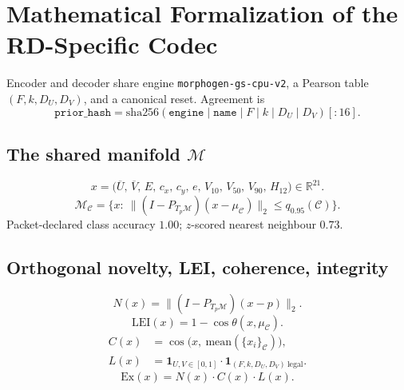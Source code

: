 \documentclass[12pt,oneside]{book}
\providecommand{\R}{\mathbb{R}}
\newcommand{\ind}{\mathbf{1}}
\newcommand{\Cclass}{\mathcal{C}}
\newcommand{\Man}{\mathcal{M}}
\newcommand{\Ex}{\mathrm{Ex}}
\newcommand{\LEI}{\mathrm{LEI}}
\begin{document}
\section{Mathematical Formalization of the RD-Specific Codec}
\label{sec:math}

Encoder and decoder share engine \texttt{morphogen-gs-cpu-v2}, a Pearson
table $(F,k,D_U,D_V)$, and a canonical reset. Agreement is
\begin{equation}
  \label{eq:prior-hash}
  \texttt{prior\_hash}
  =\mathrm{sha256}(\texttt{engine}\mid\texttt{name}\mid F\mid k\mid D_U\mid D_V)[:16].
\end{equation}

\subsection{The shared manifold \texorpdfstring{\(\Man\)}{M}}
\label{sec:manifold}
\begin{equation}
  \label{eq:feature}
  x=\bigl(\overline{U},\,\overline{V},\,E,\,c_x,\,c_y,\,e,\,
  V_{10},\,V_{50},\,V_{90},\,H_{12}\bigr)\in\R^{21}.
\end{equation}
\begin{equation}
  \label{eq:manifold}
  \Man_{\Cclass}
  =\bigl\{
    x:\ \bigl\|(I-P_{T_p\Man})(x-\mu_{\Cclass})\bigr\|_2
    \le q_{0.95}(\Cclass)
  \bigr\}.
\end{equation}
Packet-declared class accuracy $1.00$; $z$-scored nearest neighbour $0.73$.

\subsection{Orthogonal novelty, LEI, coherence, integrity}
\label{sec:extropy}
\begin{equation}
  \label{eq:N}
  N(x)=\bigl\|(I-P_{T_p\Man})(x-p)\bigr\|_2.
\end{equation}
\begin{equation}
  \label{eq:lei}
  \LEI(x)=1-\cos\theta(x,\mu_{\Cclass}).
\end{equation}
\begin{equation}
  \label{eq:CL}
  \begin{aligned}
    C(x)&=\cos\bigl(x,\ \mathrm{mean}(\{x_i\}_{\Cclass})\bigr),\\
    L(x)&=\ind_{U,V\in[0,1]}\cdot
          \ind_{(F,k,D_U,D_V)\ \mathrm{legal}}.
  \end{aligned}
\end{equation}
\begin{equation}
  \label{eq:Ex}
  \Ex(x)=N(x)\cdot C(x)\cdot L(x).
\end{equation}
\end{document}
